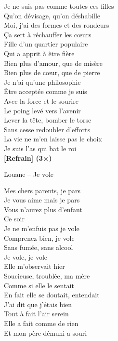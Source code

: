 \documentclass{novel}
\begin{document}
\begin{multicols}{2}
Je ne suis pas comme toutes ces filles \\
Qu'on dévisage, qu'on déshabille \\
Moi, j'ai des formes et des rondeurs \\
Ça sert à réchauffer les cœurs \\
Fille d'un quartier populaire \\
Qui a apprit à être fière \\
Bien plus d'amour, que de misère \\
Bien plus de cœur, que de pierre \\

Je n'ai qu'une philosophie \\
Être acceptée comme je suis \\
Avec la force et le sourire \\
Le poing levé vers l'avenir \\
Lever la tête, bomber le torse \\
Sans cesse redoubler d'efforts \\
La vie ne m'en laisse pas le choix \\
Je suis l'as qui bat le roi \\

\textbf{[Refrain] (3×)}\\

\end{multicols}

\newpage
\normalsize
\h*{Louane – Je vole}

Mes chers parents, je pars \\
Je vous aime mais je pars \\
Vous n'aurez plus d'enfant \\
Ce soir \\

Je ne m'enfuis pas je vole \\
Comprenez bien, je vole \\
Sans fumée, sans alcool \\
Je vole, je vole \\

Elle m'observait hier \\
Soucieuse, troublée, ma mère \\
Comme si elle le sentait \\
En fait elle se doutait, entendait \\

J'ai dit que j'étais bien \\
Tout à fait l'air serein \\
Elle a fait comme de rien \\
Et mon père démuni a souri \\
\end{document}

